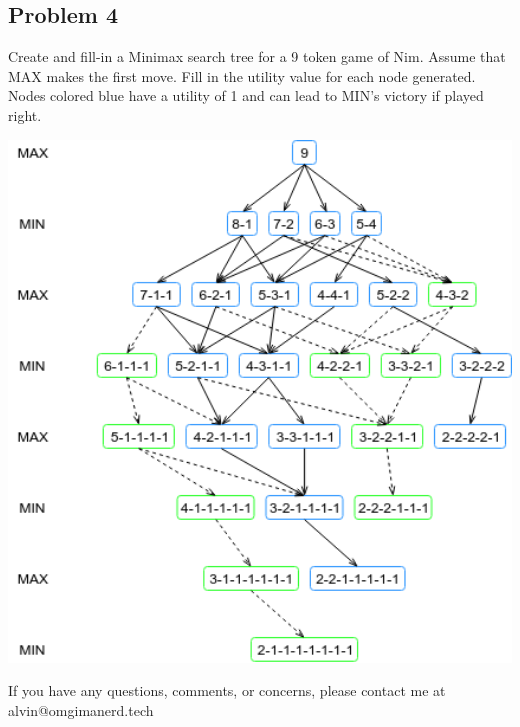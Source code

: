 \documentclass{math}
\begin{document}
\subsection*{Problem 4}
Create and fill-in a Minimax search tree for a 9 token game of Nim. Assume
that MAX makes the first move. Fill in the utility value for each node
generated. \\
Nodes colored blue have a utility of 1 and can lead to MIN's victory if played
right.
\begin{center}
  \includegraphics[width=14cm]{assets/hw_03_04.png}
\end{center}

\begin{center}
  If you have any questions, comments, or concerns, please contact me at
  alvin@omgimanerd.tech
\end{center}
\end{document}

